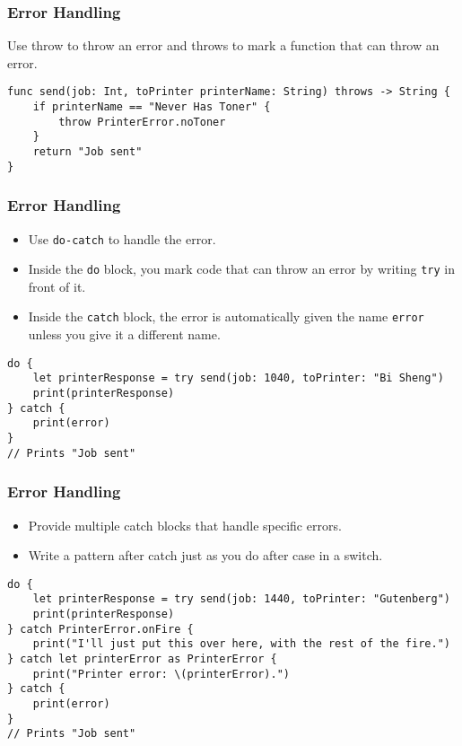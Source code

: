 \begin{frame}[fragile] \frametitle{Error Handling}

Use throw to throw an error and throws to mark a function that can throw an error. 

\begin{lstlisting}
func send(job: Int, toPrinter printerName: String) throws -> String {
    if printerName == "Never Has Toner" {
        throw PrinterError.noToner
    }
    return "Job sent"
}
\end{lstlisting}


\end{frame}


\begin{frame}[fragile] \frametitle{Error Handling}

\begin{itemize}
\item Use \lstinline|do-catch| to handle the error.
\item Inside the \lstinline|do| block, you mark code that can throw an error by writing \lstinline|try| in front of it.
\item Inside the \lstinline|catch| block, the error is automatically given the name \lstinline|error| unless you give it a different name. 
\end{itemize}

\begin{lstlisting}
do {
    let printerResponse = try send(job: 1040, toPrinter: "Bi Sheng")
    print(printerResponse)
} catch {
    print(error)
}
// Prints "Job sent"
\end{lstlisting}


\end{frame}

\begin{frame}[fragile] \frametitle{Error Handling}

\begin{itemize}
\item Provide multiple catch blocks that handle specific errors. 
\item Write a pattern after catch just as you do after case in a switch.
\end{itemize}

\begin{lstlisting}
do {
    let printerResponse = try send(job: 1440, toPrinter: "Gutenberg")
    print(printerResponse)
} catch PrinterError.onFire {
    print("I'll just put this over here, with the rest of the fire.")
} catch let printerError as PrinterError {
    print("Printer error: \(printerError).")
} catch {
    print(error)
}
// Prints "Job sent"
\end{lstlisting}


\end{frame}

